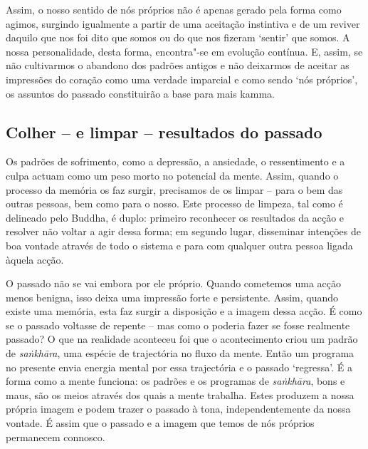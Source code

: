 Assim, o nosso sentido de nós próprios não é apenas gerado pela forma como
agimos, surgindo igualmente a partir de uma aceitação instintiva e de um reviver
daquilo que nos foi dito que somos ou do que nos fizeram `sentir' que somos. A
nossa personalidade, desta forma, encontra"-se em evolução contínua. E, assim, se
não cultivarmos o abandono dos padrões antigos e não deixarmos de aceitar as
impressões do coração como uma verdade imparcial e como sendo `nós próprios', os
assuntos do passado constituirão a base para mais kamma.

\subsection{Colher -- e limpar -- resultados do passado}

Os padrões de sofrimento, como a depressão, a ansiedade, o ressentimento e a
culpa actuam como um peso morto no potencial da mente. Assim, quando o processo
da memória os faz surgir, precisamos de os limpar -- para o bem das outras
pessoas, bem como para o nosso. Este processo de limpeza, tal como é delineado
pelo Buddha, é duplo: primeiro reconhecer os resultados da acção e resolver não
voltar a agir dessa forma; em segundo lugar, disseminar intenções de boa vontade
através de todo o sistema e para com qualquer outra pessoa ligada àquela acção.

O passado não se vai embora por ele próprio. Quando cometemos uma acção menos
benigna, isso deixa uma impressão forte e persistente. Assim, quando existe uma
memória, esta faz surgir a disposição e a imagem dessa acção. É como se o
passado voltasse de repente -- mas como o poderia fazer se fosse realmente
passado? O que na realidade aconteceu foi que o acontecimento criou um padrão de
\emph{saṅkhāra}, uma espécie de trajectória no fluxo da mente. Então um programa
no presente envia energia mental por essa trajectória e o passado `regressa'. É
a forma como a mente funciona: os padrões e os programas de \emph{saṅkhāra},
bons e maus, são os meios através dos quais a mente trabalha. Estes produzem a
nossa própria imagem e podem trazer o passado à tona, independentemente da nossa
vontade. É assim que o passado e a imagem que temos de nós próprios permanecem
connosco.

